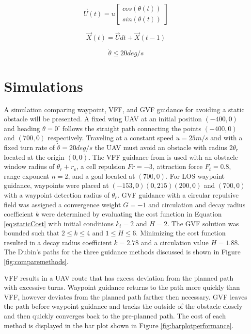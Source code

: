 \documentclass[conf]{new-aiaa}
\begin{document}
\begin{equation}
\label{eq:uavVelocity}
\overrightarrow{U}(t) = u \begin{bmatrix}
cos(\theta(t)) \\
sin(\theta(t))
\end{bmatrix}
\end{equation}


\begin{equation}
\label{eq:uavPosition}
\overrightarrow{X}(t) = \overrightarrow{U}dt + \overrightarrow{X}(t-1)
\end{equation}


\begin{equation}
\label{turnRate}
\dot{\theta} \leq 20 deg/s
\end{equation}


\section{Simulations}

A simulation comparing waypoint, VFF, and GVF guidance for avoiding a static obstacle will be presented. A fixed wing UAV at an initial position $(-400,0)$ and heading $\theta=0^\circ$ follows the straight path connecting the points $(-400,0)$ and $(700,0)$ respectively. Traveling at a constant speed $u=25 m/s$ and with a fixed turn rate of $\dot{\theta}=20 deg/s$ the UAV must avoid an obstacle with radius $2\theta_r$ located at the origin $(0,0)$. The VFF guidance from \cite{borenstein_real-time_1990} is used with an obstacle window radius of $\theta_r+r_o$, a cell repulsion $Fr=-3$, attraction force $F_t=0.8$, range exponent $n=2$, and a goal located at $(700,0)$. For LOS waypoint guidance, waypoints were placed at $(-153,0) (0,215)(200,0)$ and $(700,0)$ with a waypoint detection radius of $\theta_r$. GVF guidance with a circular repulsive field was assigned a convergence weight $G=-1$ and circulation and decay radius coefficient $k$ were determined by evaluating the cost function in Equation \ref{eq:staticCost} with initial conditions $k_i = 2$ and $H=2$. The GVF solution was bounded such that $2\leq k\leq 4$ and $1\leq H\leq 6$. Minimizing the cost function resulted in a decay radius coefficient $k=2.78$ and a circulation value $H=1.88$. The Dubin's paths for the three guidance methods discussed is shown in Figure \ref{fig:comparemethods}. 

VFF results in a UAV route that has excess deviation from the planned path with excessive turns. Waypoint guidance returns to the path more quickly than VFF, however deviates from the planned path farther then necessary. GVF leaves the path before waypoint guidance and tracks the outside of the obstacle closely and then quickly converges back to the pre-planned path. The cost of each method is displayed in the bar plot shown in Figure \ref{fig:barplotperformance}.
\end{document}
